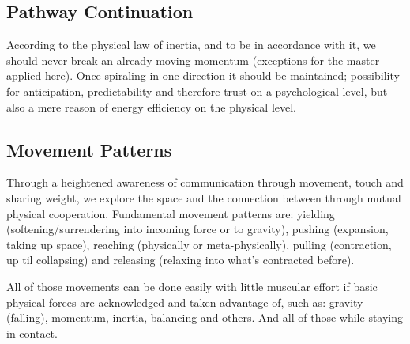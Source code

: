 \subsection{Pathway Continuation}\label{subsec:pathway-continuation}

According to the physical law of inertia, and to be in accordance with it, we should never break an already moving momentum (exceptions for the master applied here).
Once spiraling in one direction it should be maintained; possibility for anticipation, predictability and therefore trust on a psychological level, but also a mere reason of energy efficiency on the physical level.

\subsection{Movement Patterns}\label{subsec:movement-patterns}

Through a heightened awareness of communication through movement, touch and sharing weight, we explore the space and the connection between through mutual physical cooperation.
Fundamental movement patterns are: yielding (softening/surrendering into incoming force or to gravity), pushing (expansion, taking up space), reaching (physically or meta-physically), pulling (contraction, up til collapsing) and releasing (relaxing into what's contracted before).

All of those movements can be done easily with little muscular effort if basic physical forces are acknowledged and taken advantage of, such as: gravity (falling), momentum, inertia, balancing and others.
And all of those while staying in contact.
